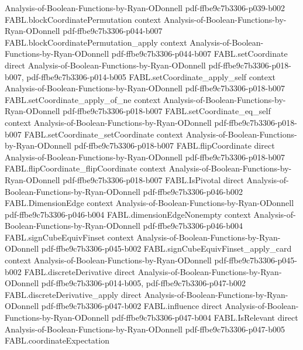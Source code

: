 \begin{theorem}
  {Analysis-of-Boolean-Functions-by-Ryan-ODonnell}
  {pdf-ffbe9c7b3306-p039-b002}
\proofstep
  {FABL.blockCoordinatePermutation}
  {context}
  {Analysis-of-Boolean-Functions-by-Ryan-ODonnell}
  {pdf-ffbe9c7b3306-p044-b007}
\proofstep
  {FABL.blockCoordinatePermutation_apply}
  {context}
  {Analysis-of-Boolean-Functions-by-Ryan-ODonnell}
  {pdf-ffbe9c7b3306-p044-b007}
\proofstep
  {FABL.setCoordinate}
  {direct}
  {Analysis-of-Boolean-Functions-by-Ryan-ODonnell}
  {pdf-ffbe9c7b3306-p018-b007,
    pdf-ffbe9c7b3306-p014-b005}
\proofstep
  {FABL.setCoordinate_apply_self}
  {context}
  {Analysis-of-Boolean-Functions-by-Ryan-ODonnell}
  {pdf-ffbe9c7b3306-p018-b007}
\proofstep
  {FABL.setCoordinate_apply_of_ne}
  {context}
  {Analysis-of-Boolean-Functions-by-Ryan-ODonnell}
  {pdf-ffbe9c7b3306-p018-b007}
\proofstep
  {FABL.setCoordinate_eq_self}
  {context}
  {Analysis-of-Boolean-Functions-by-Ryan-ODonnell}
  {pdf-ffbe9c7b3306-p018-b007}
\proofstep
  {FABL.setCoordinate_setCoordinate}
  {context}
  {Analysis-of-Boolean-Functions-by-Ryan-ODonnell}
  {pdf-ffbe9c7b3306-p018-b007}
\proofstep
  {FABL.flipCoordinate}
  {direct}
  {Analysis-of-Boolean-Functions-by-Ryan-ODonnell}
  {pdf-ffbe9c7b3306-p018-b007}
\proofstep
  {FABL.flipCoordinate_flipCoordinate}
  {context}
  {Analysis-of-Boolean-Functions-by-Ryan-ODonnell}
  {pdf-ffbe9c7b3306-p018-b007}
\proofstep
  {FABL.IsPivotal}
  {direct}
  {Analysis-of-Boolean-Functions-by-Ryan-ODonnell}
  {pdf-ffbe9c7b3306-p046-b002}
\proofstep
  {FABL.DimensionEdge}
  {context}
  {Analysis-of-Boolean-Functions-by-Ryan-ODonnell}
  {pdf-ffbe9c7b3306-p046-b004}
\proofstep
  {FABL.dimensionEdgeNonempty}
  {context}
  {Analysis-of-Boolean-Functions-by-Ryan-ODonnell}
  {pdf-ffbe9c7b3306-p046-b004}
\proofstep
  {FABL.signCubeEquivFinset}
  {context}
  {Analysis-of-Boolean-Functions-by-Ryan-ODonnell}
  {pdf-ffbe9c7b3306-p045-b002}
\proofstep
  {FABL.signCubeEquivFinset_apply_card}
  {context}
  {Analysis-of-Boolean-Functions-by-Ryan-ODonnell}
  {pdf-ffbe9c7b3306-p045-b002}
\proofstep
  {FABL.discreteDerivative}
  {direct}
  {Analysis-of-Boolean-Functions-by-Ryan-ODonnell}
  {pdf-ffbe9c7b3306-p014-b005,
    pdf-ffbe9c7b3306-p047-b002}
\proofstep
  {FABL.discreteDerivative_apply}
  {direct}
  {Analysis-of-Boolean-Functions-by-Ryan-ODonnell}
  {pdf-ffbe9c7b3306-p047-b002}
\proofstep
  {FABL.influence}
  {direct}
  {Analysis-of-Boolean-Functions-by-Ryan-ODonnell}
  {pdf-ffbe9c7b3306-p047-b004}
\proofstep
  {FABL.IsRelevant}
  {direct}
  {Analysis-of-Boolean-Functions-by-Ryan-ODonnell}
  {pdf-ffbe9c7b3306-p047-b005}
\proofstep
  {FABL.coordinateExpectation}

\end{theorem}
